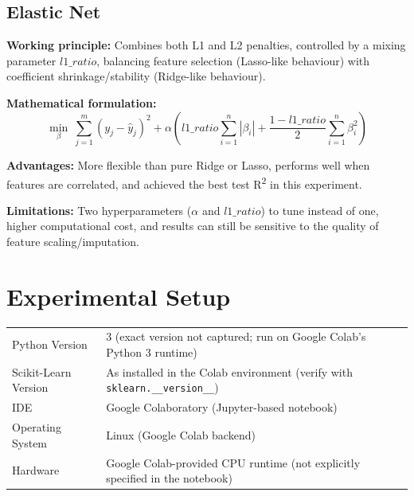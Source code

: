 \documentclass[12pt,a4paper]{article}
\begin{document}
\subsection*{Elastic Net}
\textbf{Working principle:} Combines both L1 and L2 penalties, controlled by a mixing parameter $l1\_ratio$, balancing feature selection (Lasso-like behaviour) with coefficient shrinkage/stability (Ridge-like behaviour).

\textbf{Mathematical formulation:}
\[
\min_{\beta}\ \sum_{j=1}^{m}\left(y_j - \hat{y}_j\right)^2 + \alpha\left(l1\_ratio\sum_{i=1}^n|\beta_i| + \frac{1-l1\_ratio}{2}\sum_{i=1}^n \beta_i^2\right)
\]

\textbf{Advantages:} More flexible than pure Ridge or Lasso, performs well when features are correlated, and achieved the best test R\textsuperscript{2} in this experiment.

\textbf{Limitations:} Two hyperparameters ($\alpha$ and $l1\_ratio$) to tune instead of one, higher computational cost, and results can still be sensitive to the quality of feature scaling/imputation.

\section{Experimental Setup}
\begin{tabular}{ll}
\toprule
Python Version & 3 (exact version not captured; run on Google Colab's Python 3 runtime)\\
Scikit-Learn Version & As installed in the Colab environment (verify with \texttt{sklearn.\_\_version\_\_})\\
IDE & Google Colaboratory (Jupyter-based notebook)\\
Operating System & Linux (Google Colab backend)\\
Hardware & Google Colab-provided CPU runtime (not explicitly specified in the notebook)\\
\bottomrule
\end{tabular}
\end{document}
